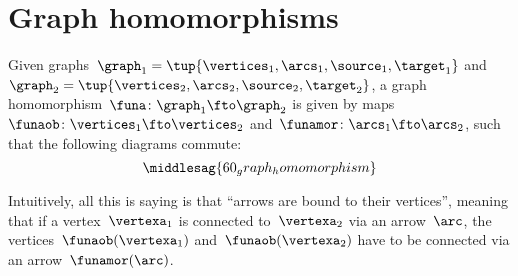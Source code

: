 
\section{Graph homomorphisms}
\begin{definition}
    \label{def:graph_homom}
    Given graphs~$\graph_1=\tup{\vertices_1,\arcs_1,\source_1,\target_1}$ and~$\graph_2=\tup{\vertices_2,\arcs_2,\source_2,\target_2}$, a graph homomorphism~$\funa \colon \graph_1 \fto \graph_2$ is given by maps~$\funaob\colon \vertices_1 \fto \vertices_2$ and~$\funamor\colon \arcs_1 \fto \arcs_2$, such that the following diagrams commute:
    \begin{equation}
        \middlesag{60_graph_homomorphism}
    \end{equation}
\end{definition}

\begin{remark}
    Intuitively, all this is saying is that ``arrows are bound to their vertices'', meaning that if a vertex~$\vertexa_1$ is connected to~$\vertexa_2$ via an arrow~$\arc$, the vertices~$\funaob(\vertexa_1)$ and~$\funaob(\vertexa_2)$ have to be connected via an arrow~$\funamor(\arc)$.
\end{remark}

